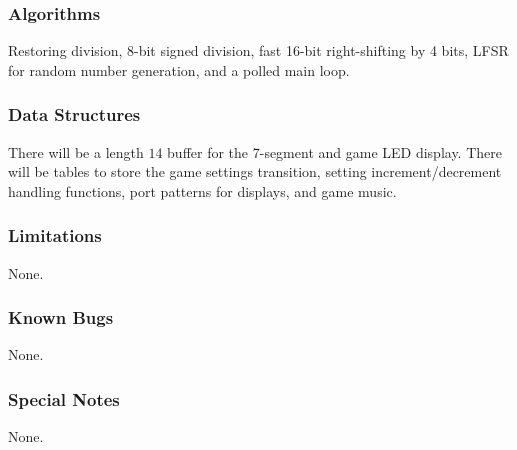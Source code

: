 \documentclass[12pt]{article}
\begin{document}
\subsubsection*{Algorithms}
Restoring division, 8-bit signed division, fast 16-bit right-shifting by 4 bits, LFSR for random number generation, and a polled main loop.

\subsubsection*{Data Structures}
There will be a length $14$ buffer for the 7-segment and game LED display. There will be tables to store the game settings transition, setting increment/decrement handling functions, port patterns for displays, and game music.

\subsubsection*{Limitations}
None.

\subsubsection*{Known Bugs}
None.

\subsubsection*{Special Notes}
None.
\end{document}
